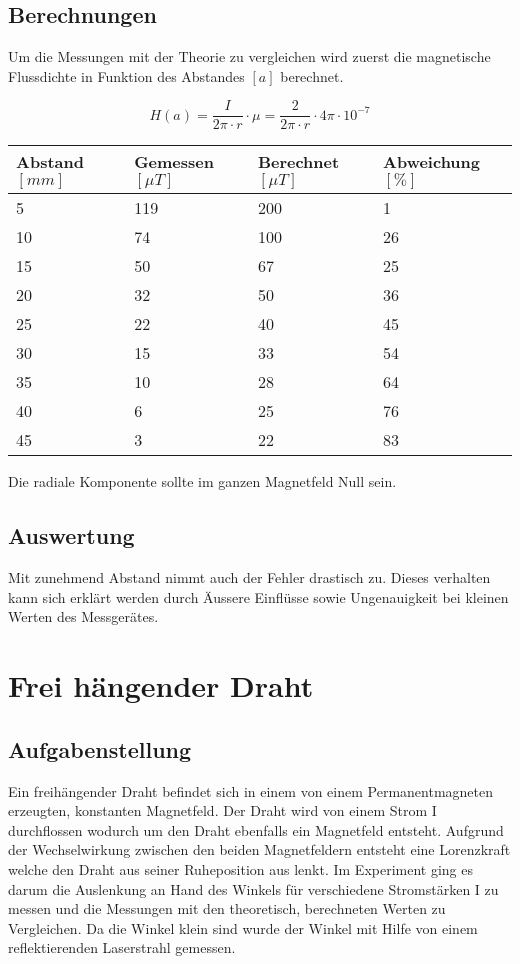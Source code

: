 \documentclass{article}
\begin{document}
\subsection{Berechnungen}
Um die Messungen mit der Theorie zu vergleichen wird zuerst die magnetische Flussdichte in Funktion des Abstandes $[a]$ berechnet.

\begin{equation}
H(a) = \frac{I}{2\pi \cdot r} \cdot \mu = \frac{2}{2\pi \cdot r} \cdot 4\pi\cdot 10^{-7}
\end{equation}	

\begin{table}[H]
	\begin{tabular}{|l|l|l|l|}
		\hline
		Abstand$[mm]$ & Gemessen$[\mu T]$ & Berechnet$[\mu T]$ & Abweichung$[\%]$ \\ \hline
		5             & 119         & 200         & 1          \\ 
		10            & 74          & 100         & 26         \\ 
		15            & 50          & 67          & 25         \\ 
		20            & 32          & 50          & 36         \\ 
		25            & 22          & 40          & 45         \\ 
		30            & 15          & 33          & 54         \\ 
		35            & 10          & 28          & 64         \\ 
		40            & 6           & 25          & 76         \\ 
		45            & 3           & 22          & 83         \\
		\hline
	\end{tabular}
\end{table}
 
Die radiale Komponente sollte im ganzen Magnetfeld Null sein.
\subsection{Auswertung}
Mit zunehmend Abstand nimmt auch der Fehler drastisch zu. Dieses verhalten kann sich erklärt werden durch Äussere Einflüsse sowie Ungenauigkeit bei kleinen Werten des Messgerätes.
\section{Frei hängender Draht}
\subsection{Aufgabenstellung}
Ein freihängender Draht befindet sich in einem von einem Permanentmagneten erzeugten, konstanten
Magnetfeld. Der Draht wird von einem Strom I durchflossen wodurch um den Draht ebenfalls ein
Magnetfeld entsteht. Aufgrund der Wechselwirkung zwischen den beiden Magnetfeldern entsteht eine
Lorenzkraft welche den Draht aus seiner Ruheposition aus lenkt. Im Experiment ging es darum die
Auslenkung an Hand des Winkels für verschiedene Stromstärken I zu messen und die Messungen
mit den theoretisch, berechneten Werten zu Vergleichen. Da die Winkel klein sind wurde der Winkel
mit Hilfe von einem reflektierenden Laserstrahl gemessen.
\end{document}
